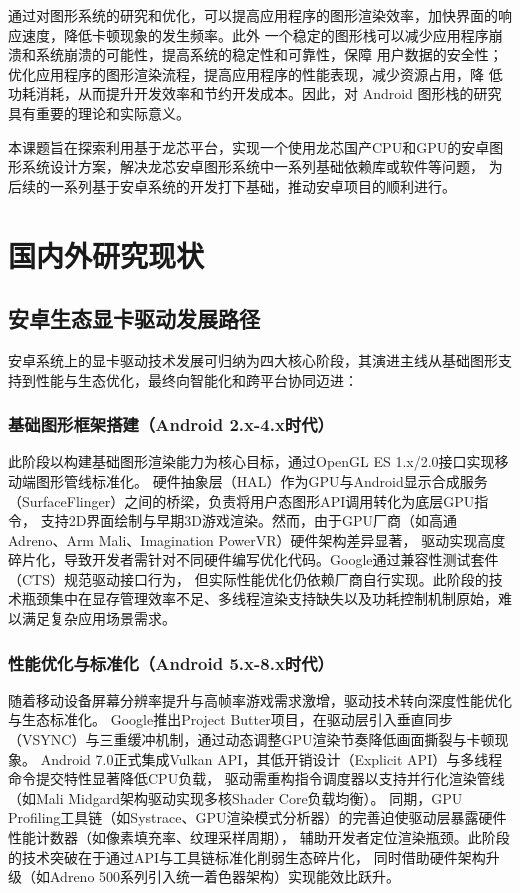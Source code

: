 通过对图形系统的研究和优化，可以提高应用程序的图形渲染效率，加快界面的响应速度，降低卡顿现象的发生频率。此外
一个稳定的图形栈可以减少应用程序崩溃和系统崩溃的可能性，提高系统的稳定性和可靠性，保障
用户数据的安全性；优化应用程序的图形渲染流程，提高应用程序的性能表现，减少资源占用，降
低功耗消耗，从而提升开发效率和节约开发成本。因此，对 Android 图形栈的研究具有重要的理论和实际意义。

本课题旨在探索利用基于龙芯平台，实现一个使用龙芯国产CPU和GPU的安卓图形系统设计方案，解决龙芯安卓图形系统中一系列基础依赖库或软件等问题，
为后续的一系列基于安卓系统的开发打下基础，推动安卓项目的顺利进行。

\section{国内外研究现状}

\subsection{安卓生态显卡驱动发展路径}
安卓系统上的显卡驱动技术发展可归纳为四大核心阶段，其演进主线从基础图形支持到性能与生态优化，最终向智能化和跨平台协同迈进：

\subsubsection{基础图形框架搭建（Android 2.x-4.x时代）}

此阶段以构建基础图形渲染能力为核心目标，通过OpenGL ES 1.x/2.0接口实现移动端图形管线标准化\cite{opengles}。
硬件抽象层（HAL）作为GPU与Android显示合成服务（SurfaceFlinger）之间的桥梁，负责将用户态图形API调用转化为底层GPU指令，
支持2D界面绘制与早期3D游戏渲染。然而，由于GPU厂商（如高通Adreno、Arm Mali\cite{mali}、Imagination PowerVR）硬件架构差异显著，
驱动实现高度碎片化，导致开发者需针对不同硬件编写优化代码。Google通过兼容性测试套件（CTS）规范驱动接口行为，
但实际性能优化仍依赖厂商自行实现。此阶段的技术瓶颈集中在显存管理效率不足、多线程渲染支持缺失以及功耗控制机制原始，难以满足复杂应用场景需求。

\subsubsection{性能优化与标准化（Android 5.x-8.x时代）​}

随着移动设备屏幕分辨率提升与高帧率游戏需求激增，驱动技术转向深度性能优化与生态标准化。
Google推出Project Butter项目，在驱动层引入垂直同步（VSYNC）与三重缓冲机制，通过动态调整GPU渲染节奏降低画面撕裂与卡顿现象\cite{GoogleIO2012}。
Android 7.0正式集成Vulkan API，其低开销设计（Explicit API）与多线程命令提交特性显著降低CPU负载，
驱动需重构指令调度器以支持并行化渲染管线（如Mali Midgard架构驱动实现多核Shader Core负载均衡）\cite{vulkan}。
同期，GPU Profiling工具链（如Systrace、GPU渲染模式分析器）的完善迫使驱动层暴露硬件性能计数器（如像素填充率、纹理采样周期），
辅助开发者定位渲染瓶颈。此阶段的技术突破在于通过API与工具链标准化削弱生态碎片化，
同时借助硬件架构升级（如Adreno 500系列引入统一着色器架构\cite{adreno}）实现能效比跃升。

